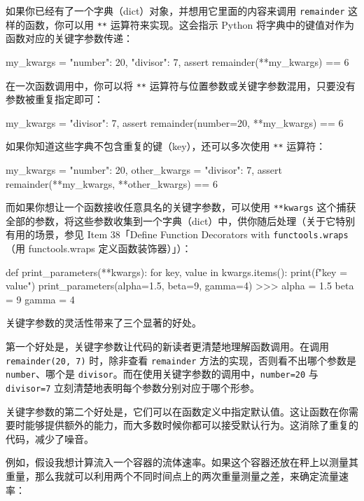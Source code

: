 如果你已经有了一个字典（dict）对象，并想用它里面的内容来调用 \texttt{remainder} 这样的函数，你可以用 \texttt{**} 运算符来实现。这会指示 Python 将字典中的键值对作为函数对应的关键字参数传递：

\begin{codebox}[python]
my_kwargs = {
    "number": 20,
    "divisor": 7,
}
assert remainder(**my_kwargs) == 6
\end{codebox}

在一次函数调用中，你可以将 \texttt{**} 运算符与位置参数或关键字参数混用，只要没有参数被重复指定即可：

\begin{codebox}[python]
my_kwargs = {
    "divisor": 7,
}
assert remainder(number=20, **my_kwargs) == 6
\end{codebox}

如果你知道这些字典不包含重复的键（key），还可以多次使用 \texttt{**} 运算符：

\begin{codebox}[python]
my_kwargs = {
    "number": 20,
}
other_kwargs = {
    "divisor": 7,
}
assert remainder(**my_kwargs, **other_kwargs) == 6
\end{codebox}

而如果你想让一个函数接收任意具名的关键字参数，可以使用 \texttt{**kwargs} 这个捕获全部的参数，将这些参数收集到一个字典（dict）中，供你随后处理（关于它特别有用的场景，参见 Item 38「Define Function Decorators with \texttt{functools.wraps}（用 functools.wraps 定义函数装饰器）」）：

\begin{codebox}[python]
def print_parameters(**kwargs):
    for key, value in kwargs.items():
        print(f"{key} = {value}")
print_parameters(alpha=1.5, beta=9, gamma=4)
>>>
alpha = 1.5
beta = 9
gamma = 4
\end{codebox}

关键字参数的灵活性带来了三个显著的好处。

第一个好处是，关键字参数让代码的新读者更清楚地理解函数调用。在调用 \texttt{remainder(20, 7)} 时，除非查看 \texttt{remainder} 方法的实现，否则看不出哪个参数是 \texttt{number}、哪个是 \texttt{divisor}。而在使用关键字参数的调用中，\texttt{number=20} 与 \texttt{divisor=7} 立刻清楚地表明每个参数分别对应于哪个形参。

关键字参数的第二个好处是，它们可以在函数定义中指定默认值。这让函数在你需要时能够提供额外的能力，而大多数时候你都可以接受默认行为。这消除了重复的代码，减少了噪音。

例如，假设我想计算流入一个容器的流体速率。如果这个容器还放在秤上以测量其重量，那么我就可以利用两个不同时间点上的两次重量测量之差，来确定流量速率：

